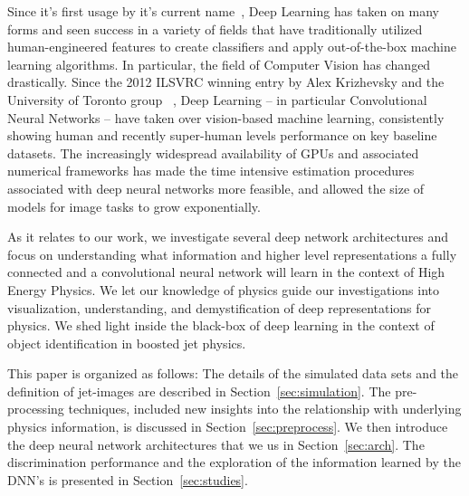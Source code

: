 \documentclass{article}
\begin{document}
Since it's first usage by it's current name~\cite{hinton06}, Deep Learning has taken on many forms and seen success in a variety of fields that have traditionally utilized human-engineered features to create classifiers and apply out-of-the-box machine learning algorithms. In particular, the field of Computer Vision has changed drastically. Since the 2012 ILSVRC winning entry by Alex Krizhevsky and the University of Toronto group ~\cite{alexnet}, Deep Learning -- in particular Convolutional Neural Networks -- have taken over vision-based machine learning, consistently showing human and recently super-human levels performance on key baseline datasets. The increasingly widespread availability of GPUs and associated numerical frameworks has made the time intensive estimation procedures associated with deep neural networks more feasible, and allowed the size of models for image tasks to grow exponentially. 

As it relates to our work, we investigate several deep network architectures and focus on  understanding what information and higher level representations a fully connected and a convolutional neural network will learn in the context of High Energy Physics. We let our knowledge of physics guide our investigations into visualization, understanding, and demystification of deep representations for physics. We shed light inside the black-box of deep learning in the context of object identification in boosted jet physics.

This paper is organized as follows:  The details of the simulated data sets and the definition of jet-images are described in Section~\ref{sec:simulation}.    The pre-processing techniques, included new insights into the relationship with underlying physics information, is discussed in Section~\ref{sec:preprocess}.  We then introduce the deep neural network architectures that we us in Section~\ref{sec:arch}.  The discrimination performance and the exploration of the information learned by the DNN's is presented in Section~\ref{sec:studies}.




\end{document}
